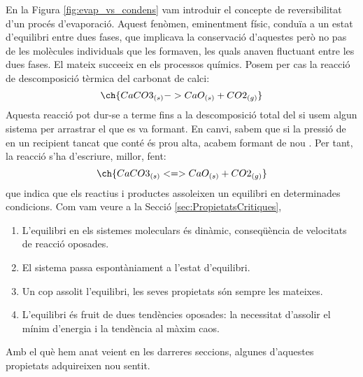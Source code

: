 En la Figura \ref{fig:evap_vs_condens} vam introduir el concepte de reversibilitat d'un procés d'evaporació. Aquest fenòmen, eminentment físic, conduïa a un estat d'equilibri entre dues fases, que implicava la conservació d'aquestes però no pas de les molècules individuals que les formaven, les quals anaven fluctuant entre les dues fases.
El mateix succeeix en els processos químics. 
Posem per cas la reacció de descomposició tèrmica del carbonat de calci:
\[
\ch{CaCO3_{(s)} -> CaO_{(s)} + CO2_{(g)}}
\]
Aquesta reacció pot dur-se a terme fins a la descomposició total del  si usem algun sistema per arrastrar el  que es va formant. En canvi, sabem que si la pressió de  en un recipient tancat que conté  és prou alta, acabem formant de nou . Per tant, la reacció s'ha d'escriure, millor, fent:
\[
\ch{CaCO3_{(s)} <=> CaO_{(s)} + CO2_{(g)}}
\]
que indica que els reactius i productes assoleixen un equilibri en determinades condicions. Com vam veure a la Secció \ref{sec:PropietatsCritiques}, 
\begin{enumerate}
\item L'equilibri en els sistemes moleculars és dinàmic, conseqüència de velocitats de reacció oposades.
\item El sistema passa espontàniament a l'estat d'equilibri.
\item Un cop assolit l'equilibri, les seves propietats són sempre les mateixes.
\item L'equilibri és fruit de dues tendències oposades: la necessitat d'assolir el mínim d'energia i la tendència al màxim caos.
\end{enumerate}
Amb el què hem anat veient en les darreres seccions, algunes d'aquestes propietats adquireixen nou sentit.
